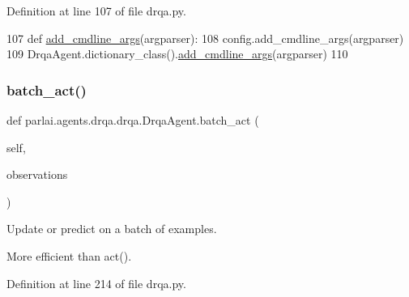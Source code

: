Definition at line 107 of file drqa.\+py.


\begin{DoxyCode}
107     \textcolor{keyword}{def }\hyperlink{namespaceparlai_1_1agents_1_1drqa_1_1config_a62fdd5554f1da6be0cba185271058320}{add\_cmdline\_args}(argparser):
108         config.add\_cmdline\_args(argparser)
109         DrqaAgent.dictionary\_class().\hyperlink{namespaceparlai_1_1agents_1_1drqa_1_1config_a62fdd5554f1da6be0cba185271058320}{add\_cmdline\_args}(argparser)
110 
\end{DoxyCode}
\mbox{\label{classparlai_1_1agents_1_1drqa_1_1drqa_1_1DrqaAgent_a5c2f02e9c1ddce46df0d216947227395}} 
\subsubsection{\texorpdfstring{batch\+\_\+act()}{batch\_act()}}
{\footnotesize\ttfamily def parlai.\+agents.\+drqa.\+drqa.\+Drqa\+Agent.\+batch\+\_\+act (\begin{DoxyParamCaption}\item[{}]{self,  }\item[{}]{observations }\end{DoxyParamCaption})}

\begin{DoxyVerb}Update or predict on a batch of examples.

More efficient than act().
\end{DoxyVerb}
 

Definition at line 214 of file drqa.\+py.


